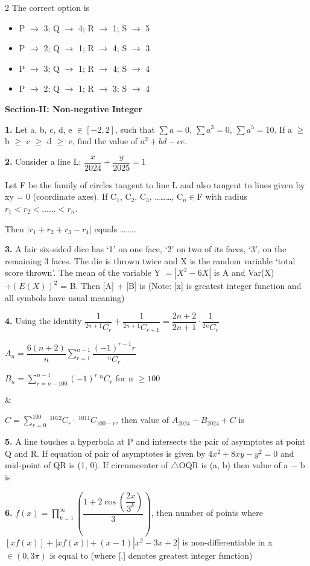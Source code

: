 \documentclass[10pt]{extarticle}
\newenvironment{qoptions}{\begin{itemize}[leftmargin=1.8em,itemsep=2pt,topsep=2pt,label={}]}{\end{itemize}}
\newcommand{\opt}[2]{\item[({#1})] {#2}}
\newcommand{\subsectionhdr}[1]{\par\vspace{3pt}\noindent\textbf{#1}\par\vspace{2pt}}
\begin{document}
\begin{multicols}{2}
The correct option is

\begin{qoptions}
\opt{A}{P $\to$ 3; Q $\to$ 4; R $\to$ 1; S $\to$ 5}
\opt{B}{P $\to$ 2; Q $\to$ 1; R $\to$ 4; S $\to$ 3}
\opt{C}{P $\to$ 3; Q $\to$ 1; R $\to$ 4; S $\to$ 4}
\opt{D}{P $\to$ 2; Q $\to$ 1; R $\to$ 3; S $\to$ 4}
\end{qoptions}

\subsectionhdr{Section-II: Non-negative Integer}

\textbf{1.} Let a, b, c, d, e $\in[-2,2]$, such that $\sum a=0$, $\sum a^3=0$, $\sum a^5=10$. If a $\ge$ b $\ge$ c $\ge$ d $\ge$ e, find the value of $a^2+bd-ce$.

\textbf{2.} Consider a line L: $\dfrac x{2024}+\dfrac y{2025}=1$

Let F be the family of circles tangent to line L and also tangent to lines given by xy = 0 (coordinate axes). If C$_1$, C$_2$, C$_3$, \ldots\ldots\ldots, C$_n\in$F with radius $r_1<r_2<\ldots\ldots<r_n$.

Then $|r_1+r_2+r_3-r_4|$ equals \ldots\ldots\ldots

\textbf{3.} A fair six-sided dice has `1' on one face, `2' on two of its faces, `3', on the remaining 3 faces. The die is thrown twice and X is the random variable `total score thrown'. The mean of the variable Y $=|X^2-6X|$ is A and Var(X) $+(E(X))^2$ = B. Then [A] + [B] is (Note: [x] is greatest integer function and all symbols have usual meaning)

\textbf{4.} Using the identity $\dfrac1{^{2n+1}C_r}+\dfrac1{^{2n+1}C_{r+1}}=\dfrac{2n+2}{2n+1}\cdot\dfrac1{^{2n}C_r}$

$A_n=\dfrac{6(n+2)}n\displaystyle\sum_{r=1}^{n-1}\dfrac{(-1)^{r-1}r}{^nC_r}$

$B_n=\displaystyle\sum_{r=n-100}^{n-1}(-1)^r\ ^nC_r$ for n $\ge100$

\&

$C=\displaystyle\sum_{r=0}^{100}\ ^{1012}C_r\cdot\ ^{1011}C_{100-r}$, then value of $A_{2024}-B_{2024}+C$ is

\textbf{5.} A line touches a hyperbola at P and intersects the pair of asymptotes at point Q and R. If equation of pair of asymptotes is given by $4x^2+8xy-y^2=0$ and mid-point of QR is (1, 0). If circumcenter of $\triangle$OQR is (a, b) then value of a $-$ b is

\textbf{6.} $f(x)=\displaystyle\prod_{k=1}^\infty\left(\dfrac{1+2\cos\left(\dfrac{2x}{3^k}\right)}3\right)$, then number of points where $[xf(x)]+|xf(x)|+(x-1)|x^2-3x+2|$ is non-differentiable in x$\in(0,3\pi)$ is equal to (where [.] denotes greatest integer function)

\end{multicols}
\end{document}
